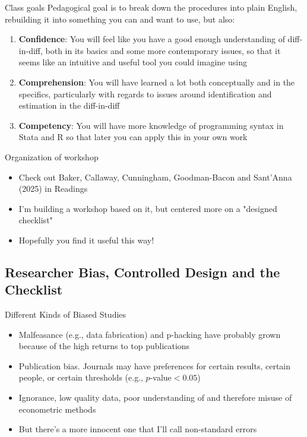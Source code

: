 \documentclass{beamer}
\begin{document}
\begin{frame}{Class goals}
Pedagogical goal is to break down the procedures into plain English, rebuilding it into something you can and want to use, but also:

  \begin{enumerate}
    \item \textbf{Confidence}: You will feel like you have a good enough understanding of diff-in-diff, both in its basics and some more contemporary issues, so that it seems like an intuitive and useful tool you could imagine using
    \item \textbf{Comprehension}: You will have learned a lot both conceptually and in the specifics, particularly with regards to issues around identification and estimation in the diff-in-diff 
    \item \textbf{Competency}: You will have more knowledge of programming syntax in Stata and R so that later you can apply this in your own work
  \end{enumerate}

\end{frame}

\begin{frame}{Organization of workshop}

\begin{itemize}

\item Check out Baker, Callaway, Cunningham, Goodman-Bacon and Sant'Anna (2025) in Readings
\item I'm building a workshop based on it, but centered more on a "designed checklist"
\item Hopefully you find it useful this way!
\end{itemize}

\end{frame}

\subsection{Researcher Bias, Controlled Design and the Checklist}


\begin{frame}{Different Kinds of Biased Studies}

\begin{itemize}
\item Malfeasance (e.g., data fabrication) and p-hacking have probably grown because of the high returns to top publications
\item Publication bias.  Journals may have preferences for certain results, certain people, or certain thresholds (e.g., $p$-value$<0.05$)
\item Ignorance, low quality data, poor understanding of and therefore misuse of econometric methods
\item But there's a more innocent one that I'll call non-standard errors
\end{itemize}

\end{frame}
\end{document}
